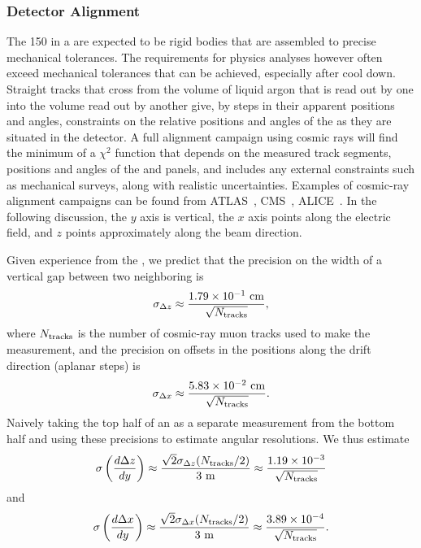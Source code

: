 \subsubsection{Detector Alignment}

The 150  in a  are expected to be rigid bodies that are assembled to
precise mechanical tolerances.  The requirements for physics analyses however often exceed 
mechanical tolerances that can be achieved, especially after cool down.  Straight tracks that cross
from the volume of liquid argon that is read out by one  into the volume read out by another 
give, by steps in their apparent positions and angles, constraints on the relative positions and angles
of the  as they are situated in the detector.   A full alignment campaign using cosmic rays will
find the minimum of a $\chi^2$ function that depends on the measured track segments, positions and angles of
the  and   panels, and includes any external constraints such as mechanical surveys, along with
realistic uncertainties.  Examples of cosmic-ray alignment campaigns can be found from 
ATLAS~\cite{LacuestaMiquel:2015ksh,Moles-Valls:2014wza}, CMS~\cite{Chatrchyan:2009km}, ALICE~\cite{Aamodt:2010aa}.
In the following discussion, the $y$ axis is vertical, the $x$ axis points along the electric field,
and $z$ points approximately along the beam direction.

Given experience from the , we predict
that the precision on the width of a vertical gap between two neighboring  is
\begin{equation}
\sigma_{\Delta z} \approx \frac{1.79\times 10^{-1}~{\rm{cm}}}{\sqrt{N_{\rm{tracks}}}},
\end{equation}
where $N_{\rm{tracks}}$ is the number of cosmic-ray muon tracks used to make the measurement,
and the precision on offsets in the  positions along the drift direction (aplanar steps) is
\begin{equation}
\sigma_{\Delta x} \approx \frac{5.83\times 10^{-2}~{\rm{cm}}}{\sqrt{N_{\rm{tracks}}}}.
\end{equation}
Naively taking the top half of an  as a separate measurement from the bottom half and using these
precisions to estimate angular resolutions.  We thus estimate
\begin{equation}
\sigma\left(\frac{d\Delta z}{dy}\right) \approx \frac{\sqrt{2}\sigma_{\Delta z}(N_{\rm{tracks}}/2)}{3~{\rm{m}}}
\approx
\frac{1.19\times 10^{-3}}{\sqrt{N_{\rm{tracks}}}}
\end{equation}
and
\begin{equation}
\sigma\left(\frac{d\Delta x}{dy}\right) \approx \frac{\sqrt{2}\sigma_{\Delta x}(N_{\rm{tracks}}/2)}{3~{\rm{m}}}
\approx
\frac{3.89\times 10^{-4}}{\sqrt{N_{\rm{tracks}}}}.
\end{equation}


